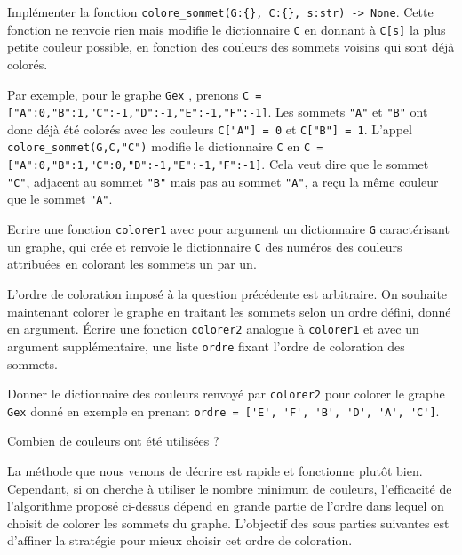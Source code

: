 \begin{question}
Implémenter la fonction \lstinline|colore_sommet(G:{}, C:{}, s:str) -> None|. Cette fonction ne renvoie rien mais modifie le dictionnaire \lstinline{C} en donnant à \lstinline{C[s]} la plus petite couleur possible, en fonction des couleurs des sommets voisins qui sont déjà colorés.

Par exemple, pour le graphe \lstinline{Gex} , prenons \lstinline{C = ["A":0,"B":1,"C":-1,"D":-1,"E":-1,"F":-1]}. Les sommets \lstinline{"A"} et \lstinline{"B"} ont donc déjà été colorés avec les couleurs \lstinline{C["A"] = 0} et \lstinline{C["B"] = 1}. L’appel \lstinline{colore_sommet(G,C,"C")} modifie le dictionnaire \lstinline{C} en \lstinline{C = ["A":0,"B":1,"C":0,"D":-1,"E":-1,"F":-1]}. Cela veut dire que le sommet \lstinline{"C"}, adjacent au sommet \lstinline{"B"} mais pas au sommet \lstinline{"A"}, a reçu la même couleur que le sommet \lstinline{"A"}.
\end{question}

\begin{question}
Ecrire une fonction \lstinline{colorer1} avec pour argument un dictionnaire \lstinline{G} caractérisant un graphe, qui crée et renvoie le dictionnaire \lstinline{C} des numéros des couleurs attribuées en colorant les sommets un par un. 
\end{question}

\begin{question}
L’ordre de coloration imposé à la question précédente est arbitraire. On souhaite maintenant colorer le graphe en traitant les sommets selon un ordre défini, donné en argument. Écrire une fonction \lstinline{colorer2} analogue à \lstinline{colorer1} et avec un argument supplémentaire, une liste \lstinline{ordre} fixant l’ordre de coloration des sommets.
\end{question}

\begin{question}
Donner le dictionnaire des couleurs renvoyé par \lstinline{colorer2} pour colorer le graphe \lstinline{Gex} donné en exemple en prenant \lstinline{ordre = ['E', 'F', 'B', 'D', 'A', 'C']}.

Combien de couleurs ont été utilisées ?
\end{question}


La méthode que nous venons de décrire est rapide et fonctionne plutôt bien. Cependant, si on cherche à utiliser le nombre minimum de couleurs, l’efficacité de l’algorithme proposé ci-dessus dépend en grande partie de l’ordre dans lequel on choisit de colorer les sommets du graphe. L’objectif des sous parties suivantes est d’affiner la stratégie pour mieux choisir cet ordre de coloration.

